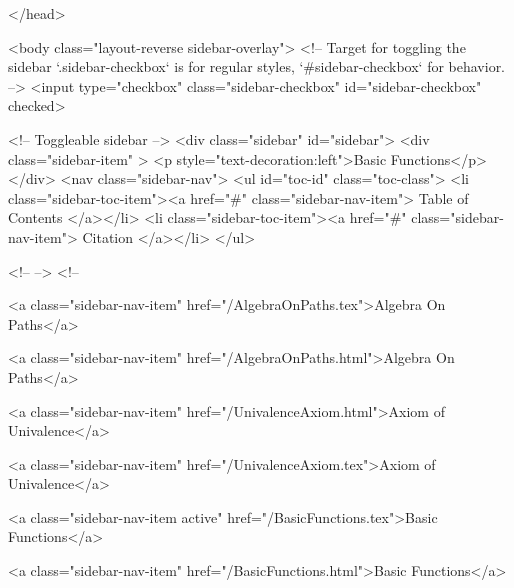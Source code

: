   
</head>




  <body class="layout-reverse sidebar-overlay">
    <!-- Target for toggling the sidebar `.sidebar-checkbox` is for regular
     styles, `#sidebar-checkbox` for behavior. -->
<input type="checkbox" class="sidebar-checkbox" id="sidebar-checkbox" checked>

<!-- Toggleable sidebar -->
<div class="sidebar" id="sidebar">
  <div class="sidebar-item" >
    <p style="text-decoration:left">Basic Functions</p>
  </div>
  <nav class="sidebar-nav">
    <ul id="toc-id" class="toc-class">
  <li class="sidebar-toc-item"><a href="#" class="sidebar-nav-item"> Table of Contents </a></li>
  <li class="sidebar-toc-item"><a href="#" class="sidebar-nav-item"> Citation </a></li>
</ul>


    <!--  -->
    <!-- 
      
    
      
    
      
    
      
        
      
    
      
        
          <a class="sidebar-nav-item" href="/AlgebraOnPaths.tex">Algebra On Paths</a>
        
      
    
      
        
          <a class="sidebar-nav-item" href="/AlgebraOnPaths.html">Algebra On Paths</a>
        
      
    
      
        
          <a class="sidebar-nav-item" href="/UnivalenceAxiom.html">Axiom of Univalence</a>
        
      
    
      
        
          <a class="sidebar-nav-item" href="/UnivalenceAxiom.tex">Axiom of Univalence</a>
        
      
    
      
        
          <a class="sidebar-nav-item active" href="/BasicFunctions.tex">Basic Functions</a>
        
      
    
      
        
          <a class="sidebar-nav-item" href="/BasicFunctions.html">Basic Functions</a>
        
      
    

